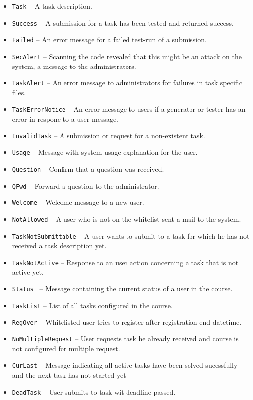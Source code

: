\begin{description}
\begin{itemize}
            \begin{itemize}
                \item {\tt Task} -- A task description.
                \item {\tt Success} -- A submission for a task has been tested and returned success.
                \item {\tt Failed} -- An error message for a failed test-run of a submission.
                \item {\tt SecAlert} -- Scanning the code revealed that this might be an
                    attack on the system, a message to the administrators.
                \item {\tt TaskAlert} -- An error message to administrators for failures in task specific files.
                \item {\tt TaskErrorNotice} -- An error message to users if a generator or tester has an error in respone to a user message.
                \item {\tt InvalidTask} -- A submission or request for a non-existent task.
                \item {\tt Usage} -- Message with system usage explanation for the user.
                \item {\tt Question} -- Confirm that a question was received.
                \item {\tt QFwd} -- Forward a question to the administrator.
                \item {\tt Welcome} -- Welcome message to a new user.
                \item {\tt NotAllowed} -- A user who is not on the whitelist sent a mail
                    to the system.
                \item {\tt TaskNotSubmittable} -- A user wants to submit to a task for which
                    he has not received a task description yet.
                \item {\tt TaskNotActive} -- Response to an user action concerning a task that is not active
                    yet.
                \item {\tt Status } -- Message containing the current status of a user in the course.
                \item {\tt TaskList} -- List of all tasks configured in the course.
                \item {\tt RegOver} -- Whitelisted user tries to register after registration end datetime.
                \item {\tt NoMultipleRequest} -- User requests task he already received and course is not
                    configured for multiple request.
                \item {\tt CurLast} -- Message indicating all active tasks have been solved sucessfully and the
                    next task has not started yet.
                \item {\tt DeadTask} -- User submits to task wit deadline passed.


\end{itemize}
\end{itemize}
\end{description}
